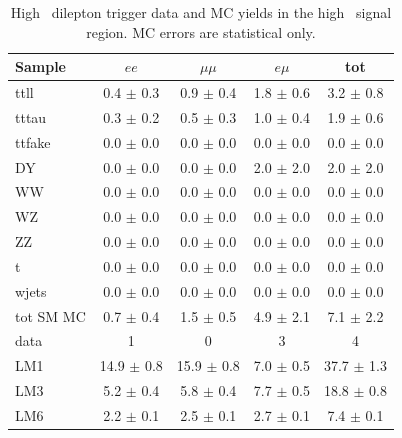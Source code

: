 \begin{table}[h!]
\begin{center}
\footnotesize
\caption{\label{tab:sigyield3} High \pt\ dilepton trigger data and MC yields in the high \Ht\ signal region. MC errors are statistical only.}
\vspace{.25cm}
\begin{tabular}{l|cccc}
\hline
         Sample   &           $ee$   &       $\mu\mu$   &         $e\mu$   &            tot  \\
\hline
           ttll   &  0.4 $\pm$ 0.3   &  0.9 $\pm$ 0.4   &  1.8 $\pm$ 0.6   &  3.2 $\pm$ 0.8  \\
          tttau   &  0.3 $\pm$ 0.2   &  0.5 $\pm$ 0.3   &  1.0 $\pm$ 0.4   &  1.9 $\pm$ 0.6  \\
         ttfake   &  0.0 $\pm$ 0.0   &  0.0 $\pm$ 0.0   &  0.0 $\pm$ 0.0   &  0.0 $\pm$ 0.0  \\
             DY   &  0.0 $\pm$ 0.0   &  0.0 $\pm$ 0.0   &  2.0 $\pm$ 2.0   &  2.0 $\pm$ 2.0  \\
             WW   &  0.0 $\pm$ 0.0   &  0.0 $\pm$ 0.0   &  0.0 $\pm$ 0.0   &  0.0 $\pm$ 0.0  \\
             WZ   &  0.0 $\pm$ 0.0   &  0.0 $\pm$ 0.0   &  0.0 $\pm$ 0.0   &  0.0 $\pm$ 0.0  \\
             ZZ   &  0.0 $\pm$ 0.0   &  0.0 $\pm$ 0.0   &  0.0 $\pm$ 0.0   &  0.0 $\pm$ 0.0  \\
              t   &  0.0 $\pm$ 0.0   &  0.0 $\pm$ 0.0   &  0.0 $\pm$ 0.0   &  0.0 $\pm$ 0.0  \\
          wjets   &  0.0 $\pm$ 0.0   &  0.0 $\pm$ 0.0   &  0.0 $\pm$ 0.0   &  0.0 $\pm$ 0.0  \\
\hline
      tot SM MC   &  0.7 $\pm$ 0.4   &  1.5 $\pm$ 0.5   &  4.9 $\pm$ 2.1   &  7.1 $\pm$ 2.2  \\
\hline
           data   &              1   &              0   &              3   &              4  \\
\hline
            LM1   & 14.9 $\pm$ 0.8   & 15.9 $\pm$ 0.8   &  7.0 $\pm$ 0.5   & 37.7 $\pm$ 1.3  \\
            LM3   &  5.2 $\pm$ 0.4   &  5.8 $\pm$ 0.4   &  7.7 $\pm$ 0.5   & 18.8 $\pm$ 0.8  \\
            LM6   &  2.2 $\pm$ 0.1   &  2.5 $\pm$ 0.1   &  2.7 $\pm$ 0.1   &  7.4 $\pm$ 0.1  \\
\hline
\end{tabular}
\end{center}
\end{table}



